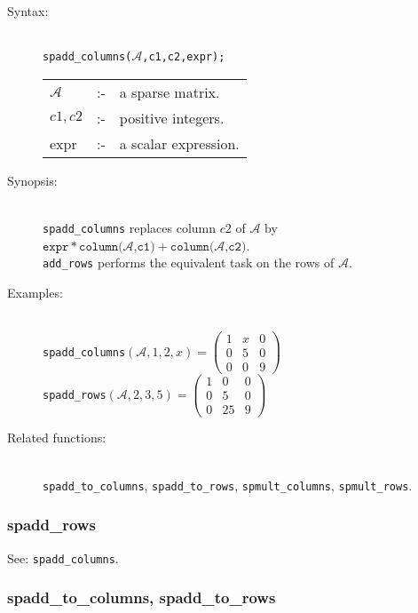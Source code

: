 \begin{description}
\item[Syntax:]\mbox{}\\
\texttt{spadd\_columns($\mathcal{A}$,c1,c2,expr);}

\begin{tabular}{l l l}
$\mathcal{A}$ & :- & a sparse matrix. \\
$c1,c2$      & :- & positive integers. \\
expr       & :- & a scalar expression.
\end{tabular}

\item[Synopsis:]\mbox{}\\
\texttt{spadd\_columns} replaces column $c2$ of $\mathcal{A}$ by\\
$\texttt{expr} * \texttt{column($\mathcal{A}$,c1)} + \texttt{column($\mathcal{A}$,c2)}$.\\
\texttt{add\_rows} performs the equivalent task on the rows of $\mathcal{A}$.

\item[Examples:]\mbox{}\\
\texttt{spadd\_columns}\((\mathcal{A},1,2,x)  =
  \begin{pmatrix} 1 & x & 0 \\ 0 & 5 & 0 \\ 0 & 0 & 9 \end{pmatrix}\) \\[2mm]
\texttt{spadd\_rows}\((\mathcal{A},2,3,5)  =
\begin{pmatrix} 1 & 0 & 0 \\ 0 & 5 & 0 \\ 0 & 25 & 9 \end{pmatrix}\)

\item[Related functions:]\mbox{}\\
\texttt{spadd\_to\_columns}, \texttt{spadd\_to\_rows},
\texttt{spmult\_columns}, \texttt{spmult\_rows}.
\end{description}

\subsubsection{spadd\_rows}
\label{sparse:spadd_rows}

See: \texttt{spadd\_columns}.


\subsubsection{spadd\_to\_columns, spadd\_to\_rows}
\label{sparse:spadd_to_columns}

